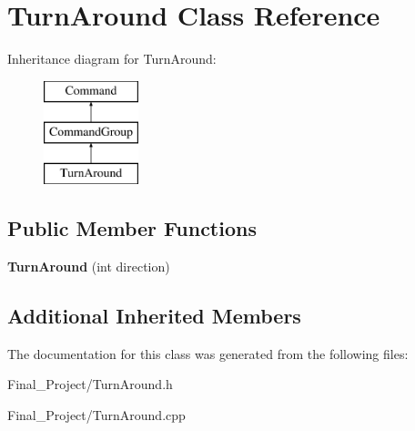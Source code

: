 \hypertarget{classTurnAround}{\section{Turn\-Around Class Reference}
\label{classTurnAround}
}
Inheritance diagram for Turn\-Around\-:\begin{figure}[H]
\begin{center}
\leavevmode
\includegraphics[height=3.000000cm]{classTurnAround}
\end{center}
\end{figure}
\subsection*{Public Member Functions}
\begin{DoxyCompactItemize}
\item 
\hypertarget{classTurnAround_ad20bf5d7d79685f3b0446a0b8e976138}{{\bfseries Turn\-Around} (int direction)}\label{classTurnAround_ad20bf5d7d79685f3b0446a0b8e976138}

\end{DoxyCompactItemize}
\subsection*{Additional Inherited Members}


The documentation for this class was generated from the following files\-:\begin{DoxyCompactItemize}
\item 
Final\-\_\-\-Project/Turn\-Around.\-h\item 
Final\-\_\-\-Project/Turn\-Around.\-cpp\end{DoxyCompactItemize}

